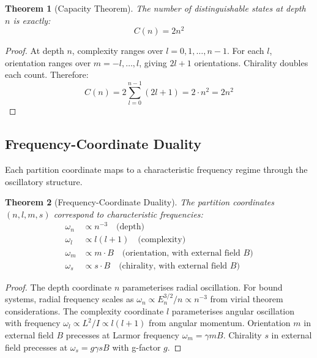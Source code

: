\documentclass[twocolumn,10pt,a4paper]{article}
\newtheorem{theorem}{Theorem}[section]
\theoremstyle{definition}
\theoremstyle{remark}
\begin{document}
\begin{theorem}[Capacity Theorem]
\label{thm:capacity}
The number of distinguishable states at depth $n$ is exactly:
\begin{equation}
C(n) = 2n^2
\end{equation}
\end{theorem}

\begin{proof}
At depth $n$, complexity ranges over $l = 0, 1, \ldots, n-1$. For each $l$, orientation ranges over $m = -l, \ldots, l$, giving $2l + 1$ orientations. Chirality doubles each count. Therefore:
\begin{equation}
C(n) = 2 \sum_{l=0}^{n-1} (2l + 1) = 2 \cdot n^2 = 2n^2
\end{equation}
\end{proof}

\subsection{Frequency-Coordinate Duality}

Each partition coordinate maps to a characteristic frequency regime through the oscillatory structure.

\begin{theorem}[Frequency-Coordinate Duality]
\label{thm:freq_duality}
The partition coordinates $(n, l, m, s)$ correspond to characteristic frequencies:
\begin{align}
\omega_n &\propto n^{-3} \quad \text{(depth)} \\
\omega_l &\propto l(l+1) \quad \text{(complexity)} \\
\omega_m &\propto m \cdot B \quad \text{(orientation, with external field } B\text{)} \\
\omega_s &\propto s \cdot B \quad \text{(chirality, with external field } B\text{)}
\end{align}
\end{theorem}

\begin{proof}
The depth coordinate $n$ parameterises radial oscillation. For bound systems, radial frequency scales as $\omega_n \propto E_n^{3/2}/n \propto n^{-3}$ from virial theorem considerations. The complexity coordinate $l$ parameterises angular oscillation with frequency $\omega_l \propto L^2/I \propto l(l+1)$ from angular momentum. Orientation $m$ in external field $B$ precesses at Larmor frequency $\omega_m = \gamma m B$. Chirality $s$ in external field precesses at $\omega_s = g \gamma s B$ with g-factor $g$.
\end{proof}
\end{document}
